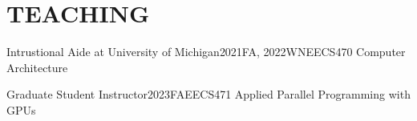 \section{TEACHING}
    \resumeSubHeadingListStart
        \resumeSubheading
        {Intrustional Aide at University of Michigan}{2021FA, 2022WN}{EECS470 Computer Architecture}{}
        \resumeItemListStart
        \resumeItemListEnd
        
        \resumeSubheading
        {Graduate Student Instructor}{2023FA}{EECS471 Applied Parallel Programming with GPUs}{}
        \resumeItemListStart
        \resumeItemListEnd
            
    \resumeSubHeadingListEnd
